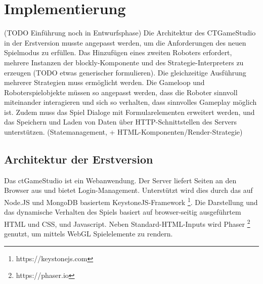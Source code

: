 \chapter{Implementierung}

(TODO Einführung noch in Entwurfsphase) Die Architektur des CTGameStudio in der Erstversion musste
angepasst werden, um die Anforderungen des neuen Spielmodus zu erfüllen. Das Hinzufügen eines
zweiten Roboters erfordert, mehrere Instanzen der blockly-Komponente und des Strategie-Interpreters
zu erzeugen (TODO etwas generischer formulieren).  Die gleichzeitige Ausführung mehrerer Strategien
muss ermöglicht werden. Die Gameloop und Roboterspielobjekte müssen so angepasst werden, dass die
Roboter sinnvoll miteinander interagieren und sich so verhalten, dass sinnvolles Gameplay möglich
ist. Zudem muss das Spiel Dialoge mit Formularelementen erweitert werden, und das Speichern und
Laden von Daten über HTTP-Schnittstellen des Servers unterstützen. (Statemanagement, +
HTML-Komponenten/Render-Strategie)


\section{Architektur der Erstversion}

Das ctGameStudio ist ein Webanwendung. Der Server liefert Seiten an den Browser aus und bietet
Login-Management. Unterstützt wird dies durch das auf Node.JS und MongoDB basiertem
KeystoneJS-Framework \footnote{https://keystonejs.com}. Die Darstellung und das dynamische Verhalten
des Spiels basiert auf browser-seitig ausgeführtem HTML und CSS, und Javascript. Neben
Standard-HTML-Inputs wird Phaser \footnote{https://phaser.io} genutzt, um mittels WebGL
Spielelemente zu rendern.

